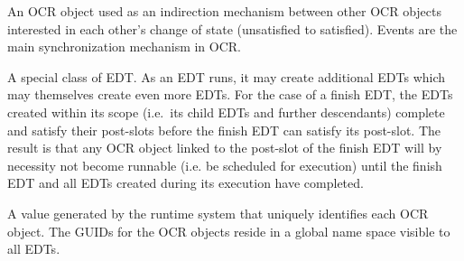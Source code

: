 
\glossarydefstart
An OCR object used as an indirection mechanism between other OCR
objects interested in each other's change of state (unsatisfied to
satisfied). Events are the main synchronization mechanism in OCR.
\glossarydefend

\glossarydefstart
A special class of EDT. As an EDT runs, it may create additional EDTs
which may themselves create even more EDTs.
For the case of a finish
EDT, the EDTs created within its scope (i.e.\ its child EDTs and further
descendants) complete and satisfy their post-slots
before the finish EDT can satisfy its post-slot. The result is that
any OCR object linked to the post-slot of the finish EDT will by
necessity not become runnable (i.e. be scheduled for
execution) until the finish EDT and all
EDTs created during its execution have completed.
%
%

\glossarydefend


\glossarydefstart
A value generated by the runtime system that uniquely identifies each
OCR object. The GUIDs for the OCR objects reside in a global name
space visible to all EDTs.
\glossarydefend

%
%

